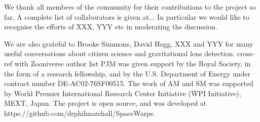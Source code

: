 We thank all \Ncollaboration members of the \sw community for their
contributions to the project so far. A complete list of collaborators is
given at... In particular we would like to recognise the efforts of XXX,
YYY etc in moderating the discussion.

We are also grateful to Brooke Simmons, David Hogg, XXX and YYY for many useful
conversations about citizen science and gravitational lens detection. %
cross-ref with Zooniverse author list
%
PJM was given support by the Royal  Society, in the form of a research
fellowship, and by the U.S. Department of Energy under contract number DE-AC02-76SF00515.
%
%
The work of AM and SM was supported by World Premier International Research
Center Initiative (WPI Initiative), MEXT, Japan.
%
%
The \sw project is open source, and was developed at
https://github.com/drphilmarshall/SpaceWarps.
